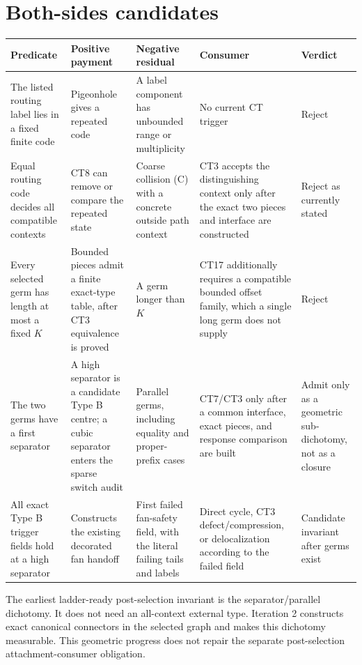 \documentclass[11pt]{article}
\begin{document}
\section{Both-sides candidates}

\begin{longtable}{>{\raggedright\arraybackslash}p{}
                  >{\raggedright\arraybackslash}p{}
                  >{\raggedright\arraybackslash}p{}
                  >{\raggedright\arraybackslash}p{}
                  >{\raggedright\arraybackslash}p{}}
\toprule
Predicate & Positive payment & Negative residual & Consumer & Verdict \\
\midrule
The listed routing label lies in a fixed finite code & Pigeonhole gives a
repeated code & A label component has unbounded range or multiplicity & No
current CT trigger & Reject \\
Equal routing code decides all compatible contexts & CT8 can remove or
compare the repeated state & Coarse collision (C) with a concrete outside
path context & CT3 accepts the distinguishing context only after the exact
two pieces and interface are constructed & Reject as currently stated \\
Every selected germ has length at most a fixed $K$ & Bounded pieces admit a
finite exact-type table, after CT3 equivalence is proved & A germ longer than
$K$ & CT17 additionally requires a compatible bounded offset family, which a
single long germ does not supply & Reject \\
The two germs have a first separator & A high separator is a candidate Type B
centre; a cubic separator enters the sparse switch audit & Parallel germs,
including equality and proper-prefix cases & CT7/CT3 only after a common
interface, exact pieces, and response comparison are built & Admit only as a
geometric sub-dichotomy, not as a closure \\
All exact Type B trigger fields hold at a high separator & Constructs the
existing decorated fan handoff & First failed fan-safety field, with the
literal failing tails and labels & Direct cycle, CT3 defect/compression, or
delocalization according to the failed field & Candidate invariant after
germs exist \\
\bottomrule
\end{longtable}

The earliest ladder-ready post-selection invariant is the
separator/parallel dichotomy.  It does not need an all-context external type.
Iteration 2 constructs exact canonical connectors in the selected graph and
makes this dichotomy measurable.  This geometric progress does not repair the
separate post-selection attachment-consumer obligation.
\end{document}
